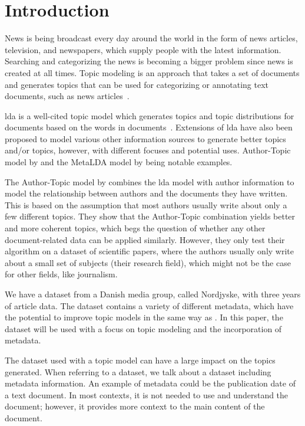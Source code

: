 \section{Introduction}\label{sec:introduction}
News is being broadcast every day around the world in the form of news articles, television, and newspapers, which supply people with the latest information.
Searching and categorizing the news is becoming a bigger problem since news is created at all times.
Topic modeling is an approach that takes a set of documents and generates topics that can be used for categorizing or annotating text documents, such as news articles~\cite{Probabilistic_Topic_Models}.

\Gls{lda} is a well-cited topic model which generates topics and topic distributions for documents based on the words in documents~\cite{blei2003latent}.
Extensions of \gls{lda} have also been proposed to model various other information sources to generate better topics and/or topics, however, with different focuses and potential uses.
Author-Topic model by \citet{author_topic_2012} and the MetaLDA model by \citet{MetaLDA2017} being notable examples.

The Author-Topic model by \citet{author_topic_2012} combines the \gls{lda} model with author information to model the relationship between authors and the documents they have written.
This is based on the assumption that most authors usually write about only a few different topics.
They show that the Author-Topic combination yields better and more coherent topics, which begs the question of whether any other document-related data can be applied similarly.
However, they only test their algorithm on a dataset of scientific papers, where the authors usually only write about a small set of subjects (their research field), which might not be the case for other fields, like journalism.

We have a dataset from a Danish media group, called Nordjyske, with three years of article data.
The dataset contains a variety of different metadata, which have the potential to improve topic models in the same way as \citet{author_topic_2012}. 
In this paper, the dataset will be used with a focus on topic modeling and the incorporation of metadata.

The dataset used with a topic model can have a large impact on the topics generated.
When referring to a dataset, we talk about a dataset including metadata information.
An example of metadata could be the publication date of a text document. 
In most contexts, it is not needed to use and understand the document; however, it provides more context to the main content of the document.

